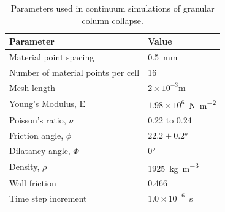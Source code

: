 \begin{table}
\caption{Parameters used in continuum simulations of granular column collapse.}
\label{table:MPMData}
\centering
\begin{tabular}{ll}
\toprule
\textbf{Parameter} & \textbf{Value} \\ \midrule
Material point spacing & 0.5~\si{\mm} \\
Number of material points per cell & 16 \\
Mesh length & $2\times10^{-3}\si{\m}$  \\
Young's Modulus, E & $1.98 \times 10 ^{6}$~\si{\N\per\m\squared} \\
Poisson's ratio, $\nu$ & 0.22 to 0.24 \\ 
Friction angle, $\phi$ & $22.2 \pm 0.2\si{\degree}$ \\
Dilatancy angle, $\varPhi$ & $0$\si{\degree} \\
Density, $\rho$ & 1925~\si{\kg\per\m\cubed}\\
Wall friction & 0.466 \\
Time step increment & $1.0 \times 10^{-6}$~\si{\second}\\ \bottomrule
\end{tabular}
\end{table}

